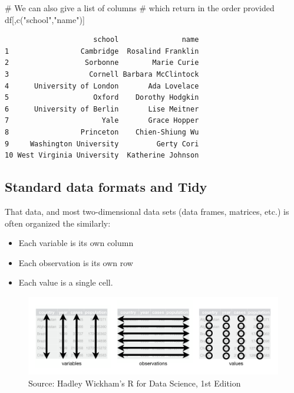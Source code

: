 \documentclass[
  letterpaper,
  DIV=11,
  numbers=noendperiod]{scrreprt}
\newenvironment{Shaded}{\begin{snugshade}}{\end{snugshade}}
\newcommand{\CommentTok}[1]{\textcolor[rgb]{0.37,0.37,0.37}{#1}}
\newcommand{\FunctionTok}[1]{\textcolor[rgb]{0.28,0.35,0.67}{#1}}
\newcommand{\NormalTok}[1]{\textcolor[rgb]{0.00,0.23,0.31}{#1}}
\newcommand{\StringTok}[1]{\textcolor[rgb]{0.13,0.47,0.30}{#1}}
\begin{document}
\begin{Shaded}
\begin{Highlighting}[]
\CommentTok{\# We can also give a list of columns}
\CommentTok{\# which return in the order provided}
\NormalTok{df[,}\FunctionTok{c}\NormalTok{(}\StringTok{"school"}\NormalTok{,}\StringTok{"name"}\NormalTok{)]}
\end{Highlighting}
\end{Shaded}

\begin{verbatim}
                     school               name
1                 Cambridge  Rosalind Franklin
2                  Sorbonne        Marie Curie
3                   Cornell Barbara McClintock
4      University of London       Ada Lovelace
5                    Oxford    Dorothy Hodgkin
6      University of Berlin       Lise Meitner
7                      Yale       Grace Hopper
8                 Princeton    Chien-Shiung Wu
9     Washington University         Gerty Cori
10 West Virginia University  Katherine Johnson
\end{verbatim}

\hypertarget{standard-data-formats-and-tidy}{%
\subsection{Standard data formats and
Tidy}\label{standard-data-formats-and-tidy}}

That data, and most two-dimensional data sets (data frames, matrices,
etc.) is often organized the similarly:

\begin{itemize}
\item
  Each variable is its own column
\item
  Each observation is its own row
\item
  Each value is a single cell.
\end{itemize}

\begin{figure}

{\centering \includegraphics[width=1\textwidth,height=\textheight]{scripts/03_dataWrangling/wrangling-files/tidy-style.png}

}

\caption{Source: Hadley Wickham's R for Data Science, 1st Edition}

\end{figure}
\end{document}
